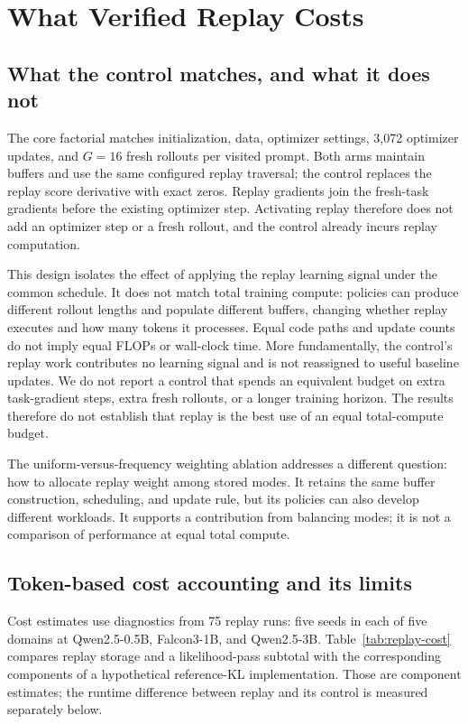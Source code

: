 \section{What Verified Replay Costs}
\label{app:replay-cost}

\subsection{What the control matches, and what it does not}
\label{app:compute-matching}

The core factorial matches initialization, data, optimizer settings, 3,072
optimizer updates, and $G=16$ fresh rollouts per visited prompt. Both arms
maintain buffers and use the same configured replay traversal; the control
replaces the replay score derivative with exact zeros. Replay gradients join
the fresh-task gradients before the existing optimizer step. Activating
replay therefore does not add an optimizer step or a fresh rollout, and the
control already incurs replay computation.

This design isolates the effect of applying the replay learning signal under
the common schedule. It does not match total training compute: policies can
produce different rollout lengths and populate different buffers, changing
whether replay executes and how many tokens it processes. Equal code paths
and update counts do not imply equal FLOPs or wall-clock time. More
fundamentally, the control's replay work contributes no learning signal and
is not reassigned to useful baseline updates. We do not report a control
that spends an equivalent budget on extra task-gradient steps, extra fresh
rollouts, or a longer training horizon. The results therefore do not establish
that replay is the best use of an equal total-compute budget.

The uniform-versus-frequency weighting ablation addresses a different
question: how to allocate replay weight among stored modes. It retains the
same buffer construction, scheduling, and update rule, but its policies can
also develop different workloads. It supports a contribution from balancing
modes; it is not a comparison of performance at equal total compute.

\subsection{Token-based cost accounting and its limits}
\label{app:compute-accounting}

Cost estimates use diagnostics from 75 replay runs: five seeds
in each of five domains at Qwen2.5-0.5B, Falcon3-1B, and Qwen2.5-3B.
Table~\ref{tab:replay-cost} compares replay storage and a likelihood-pass
subtotal with the corresponding components of a hypothetical reference-KL
implementation. Those are component estimates; the runtime difference between
replay and its control is measured separately below.

